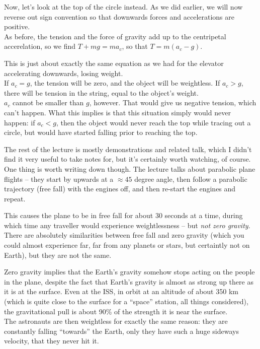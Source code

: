 \documentclass[12pt,a4paper]{report}
\begin{document}
Now, let's look at the top of the circle instead. As we did earlier, we will now reverse out sign convention so that downwards forces and accelerations are positive.\\
As before, the tension and the force of gravity add up to the centripetal accerelation, so we find $T + m g = m a_c$, so that $T = m(a_c - g)$.

This is just about exactly the same equation as we had for the elevator accelerating downwards, losing weight.\\
If $a_c = g$, the tension will be zero, and the object will be weightless. If $a_c > g$, there will be tension in the string, equal to the object's weight.\\
$a_c$ cannot be smaller than $g$, however. That would give us negative tension, which can't happen. What this implies is that this situation simply would never happen: if $a_c < g$, then the object would never reach the top while tracing out a circle, but would have started falling prior to reaching the top.

The rest of the lecture is mostly demonstrations and related talk, which I didn't find it very useful to take notes for, but it's certainly worth watching, of course.\\
One thing is worth writing down though. The lecture talks about parabolic plane flights -- they start by upwards at a $\approx 45$ degree angle, then follow a parabolic trajectory (free fall) with the engines off, and then re-start the engines and repeat.

This causes the plane to be in free fall for about 30 seconds at a time, during which time any traveller would experience weightlessness -- but \emph{not zero gravity}. There are absolutely similarities between free fall and zero gravity (which you could almost experience far, far from any planets or stars, but certaintly not on Earth), but they are not the same.

Zero gravity implies that the Earth's gravity somehow stops acting on the people in the plane, despite the fact that Earth's gravity is almost as strong up there as it is at the surface. Even at the ISS, in orbit at an altitude of about 350 km (which is quite close to the surface for a ``space'' station, all things considered), the gravitational pull is about 90\% of the strength it is near the surface.\\
The astronauts are then weightless for exactly the same reason: they are constantly falling ``towards'' the Earth, only they have such a huge sideways velocity, that they never hit it.
\end{document}
